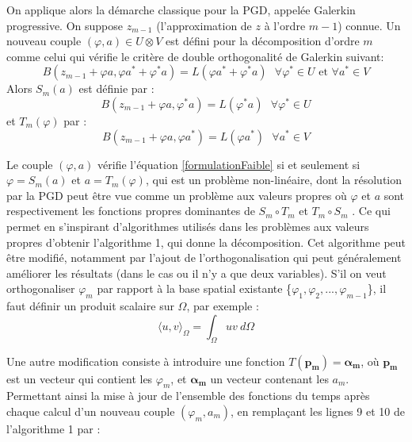\documentclass[12pt,a4paper]{report}
\begin{document}
On applique alors la démarche classique pour la PGD, appelée Galerkin progressive. On suppose $z_{m-1}$ (l'approximation de $z$ à l'ordre $m-1$) connue. Un nouveau couple $(\varphi, a) \in  U \otimes V$ est défini pour la décomposition d'ordre $m$ comme celui qui vérifie le critère de double orthogonalité de Galerkin suivant:
\begin{equation}
\label{formulationFaible}
B(z_{m-1} + \varphi a , \varphi a^* + \varphi^*  a) = L (\varphi a^* + \varphi^* a) ~~~
\forall \varphi^*  \in U \text{ et } \forall a^* \in V 
\end{equation}
Alors $S_m (a)$ est définie par :
\begin{equation}
B(z_{m-1} + \varphi a , \varphi^*  a) = L (\varphi^* a) ~~~
\forall \varphi^*  \in U
\end{equation}
et $T_m (\varphi)$ par :
\begin{equation}
B(z_{m-1} + \varphi a , \varphi a^*) = L (\varphi a^* ) ~~~
\forall a^* \in V 
\end{equation}

Le couple $(\varphi, a)$ vérifie l'équation \ref{formulationFaible} si et seulement si $\varphi = S_m (a)$ et $a = T_m (\varphi)$, qui est un problème non-linéaire, dont la résolution par la PGD peut être vue comme un problème aux valeurs propres où $\varphi$ et $a$ sont respectivement les fonctions propres dominantes de $S_m \circ T_m$ et $T_m \circ S_m$ . Ce qui permet en s'inspirant d'algorithmes utilisés dans les problèmes aux valeurs propres d'obtenir l'algorithme 1, qui donne la décomposition. Cet algorithme peut être modifié, notamment par l'ajout de l'orthogonalisation qui peut généralement améliorer les résultats (dans le cas ou il n'y a que deux variables). S'il on veut orthogonaliser $\varphi_m$ par rapport à la base spatial existante \{$\varphi_1 , \varphi_2 , ... , \varphi_{m-1}$\}, il faut définir un produit scalaire sur $\Omega$, par exemple : 
\begin{equation}
\langle u,v \rangle_\Omega = \int_\Omega \! uv ~ d\Omega
\end{equation}

Une autre modification consiste à introduire une fonction $T(\mathbf{p_m}) = \boldsymbol{\alpha}_\mathbf{m}$, où $\mathbf{p_m}$ est un vecteur qui contient les $\varphi_m$, et $\boldsymbol{\alpha}_\mathbf{m}$ un vecteur contenant les $a_m$. Permettant ainsi la mise à jour de l'ensemble des fonctions du temps après chaque calcul d'un nouveau couple $(\varphi_m , a_m )$, 
en remplaçant les lignes 9 et 10 de l'algorithme 1 par :
\end{document}
